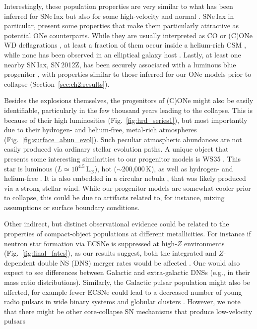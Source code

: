 \documentclass[main.tex]{subfiles}
\begin{document}
Interestingly, these population properties are very similar to what has been inferred for SNe\,Iax \citep{Foley:2012tu,Meng:2017ijx,Jha:2017gwq} but also for some  high-velocity \citep[e.g.,][]{Pan:2020grt,Zeng:2021vsz} and normal \ias \citep{Maoz:2010pz,Soker:2021dii}. 
SNe\,Iax in particular, present some properties that make them particularly attractive as potential ONe \ia counterparts. While they are usually interpreted as CO or (C)ONe WD deflagrations \citep[e.g.,][]{Kromer:2015lda,Yamanaka:2015qpa,Magee:2016vnu},  at least a fraction of them occur inside a helium-rich CSM \citep{Magee:2018aui,Jacobson-Galan:2018fqu}, while none has been observed in an elliptical galaxy host \citep{Foley:2012tu}. 
Lastly, at least one nearby SN\,Iax, SN\,2012Z, has been securely associated with a luminous blue progenitor \citep{McCully:2014jva,Stritzinger:2014lva,Yamanaka:2015qpa,McCully:2021abc}, with properties similar to those inferred for our ONe models prior to collapse (Section~\ref{sec:ch2:results}). 

Besides the explosions themselves, the progenitors of (C)ONe \ias might also be easily identifiable, particularly in the few thousand years leading to the collapse. This is  because of their high luminosities (Fig.~\ref{fig:hrd_series1}), but most importantly due to their hydrogen- and helium-free, metal-rich atmospheres (Fig.~\ref{fig:surface_abun_evol}). Such peculiar atmospheric abundances are not easily produced via ordinary stellar evolution 
paths. A unique object that presents some interesting similarities to our progenitor models is WS35 \citep{Gvaramadze:2019abc,Oskinova:2019abc}. 
This star is luminous ($L\simeq 10^{4.5}$\,L$_{\odot}$), hot ($\sim$200,000\,K), as well as hydrogen- and helium-free \citep{Oskinova:2019abc}. It is also
embedded in a circular nebula \citep{Gvaramadze:2019abc}, that was likely produced via a
strong stellar wind. While our progenitor models  are somewhat cooler prior to collapse, this could be due to artifacts related to, for instance, mixing assumptions or surface boundary conditions.   

Other indirect, but distinct observational evidence could be related to the properties of compact-object populations at different metallicities. For instance if neutron star formation via ECSNe is suppressed at high-$Z$ environments (Fig.~\ref{fig:final_fates}), as our results suggest, both the integrated and $Z$-dependent double NS (DNS) merger rates would be affected \citep{Mandel:2021abc}. One would also expect to see differences  between Galactic and extra-galactic DNSs (e.g., in their mass ratio distributions). Similarly, the Galactic pulsar population might also be affected, for example fewer ECSNe could  lead to a decreased number of young radio pulsars in wide binary systems and globular clusters \citep[][and references therein]{Antoniadis:2020gos,Willcox:2021kbg}. However, we note that there might be other core-collapse SN mechanisms that produce low-velocity pulsars \citep[see ][and references therein]{Antoniadis:2021dhe}
\end{document}
